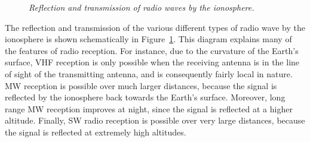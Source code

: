 \begin{figure}
\epsfysize=2.2in
\centerline{}
\caption{\em Reflection and transmission of radio waves by the ionosphere.}\label{f9.1}   
\end{figure}

The reflection and transmission of the various different types of radio wave by the
ionosphere is shown schematically in Figure~\ref{f9.1}. This diagram
explains many of the features of radio reception. For instance, due to the curvature of the Earth's surface, VHF reception
is only possible when the receiving antenna is in the line of sight of the transmitting antenna, and is consequently fairly local in nature. 
MW reception is possible over much larger distances, because the signal is reflected
by the ionosphere back towards the Earth's surface. Moreover, long range MW reception improves at night, since
the signal is reflected at a higher altitude. Finally, SW radio reception is possible
over very large distances, because the signal is reflected at extremely high altitudes. 

